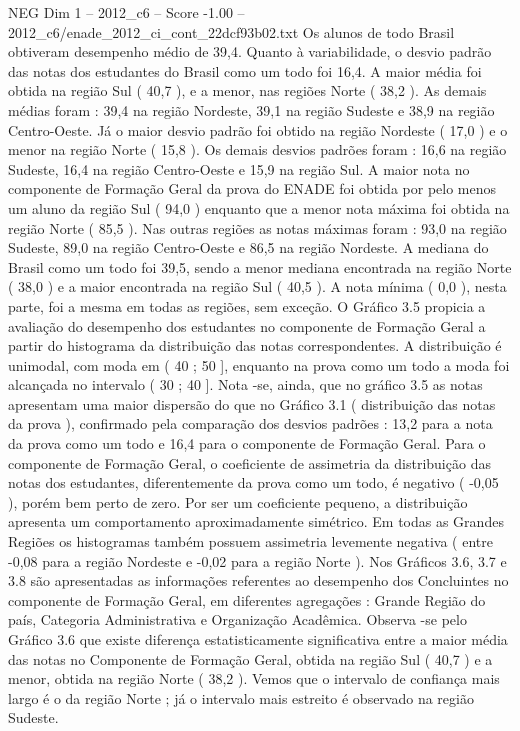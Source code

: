\begin{textsample}{NEG Dim 1 – 2012\_c6 – Score -1.00 – 2012\_c6/enade\_2012\_ci\_cont\_22dcf93b02.txt}
Os alunos de todo Brasil obtiveram desempenho médio de 39,4.
Quanto à variabilidade, o desvio padrão das notas dos estudantes do Brasil como um todo foi 16,4.
A maior média foi obtida na região Sul ( 40,7 ), e a menor, nas regiões Norte ( 38,2 ).
As demais médias foram : 39,4 na região Nordeste, 39,1 na região Sudeste e 38,9 na região Centro-Oeste.
Já o maior desvio padrão foi obtido na região Nordeste ( 17,0 ) e o menor na região Norte ( 15,8 ).
Os demais desvios padrões foram : 16,6 na região Sudeste, 16,4 na região Centro-Oeste e 15,9 na região Sul.
A maior nota no componente de Formação Geral da prova do ENADE foi obtida por pelo menos um aluno da região Sul ( 94,0 ) enquanto que a menor nota máxima foi obtida na região Norte ( 85,5 ).
Nas outras regiões as notas máximas foram : 93,0 na região Sudeste, 89,0 na região Centro-Oeste e 86,5 na região Nordeste.
A mediana do Brasil como um todo foi 39,5, sendo a menor mediana encontrada na região Norte ( 38,0 ) e a maior encontrada na região Sul ( 40,5 ).
A nota mínima ( 0,0 ), nesta parte, foi a mesma em todas as regiões, sem exceção.
O Gráfico 3.5 propicia a avaliação do desempenho dos estudantes no componente de Formação Geral a partir do histograma da distribuição das notas correspondentes.
A distribuição é unimodal, com moda em ( 40 ; 50 ], enquanto na prova como um todo a moda foi alcançada no intervalo ( 30 ; 40 ].
Nota -se, ainda, que no gráfico 3.5 as notas apresentam uma maior dispersão do que no Gráfico 3.1 ( distribuição das notas da prova ), confirmado pela comparação dos desvios padrões : 13,2 para a nota da prova como um todo e 16,4 para o componente de Formação Geral.
Para o componente de Formação Geral, o coeficiente de assimetria da distribuição das notas dos estudantes, diferentemente da prova como um todo, é negativo ( -0,05 ), porém bem perto de zero.
Por ser um coeficiente pequeno, a distribuição apresenta um comportamento aproximadamente simétrico.
Em todas as Grandes Regiões os histogramas também possuem assimetria levemente negativa ( entre -0,08 para a região Nordeste e -0,02 para a região Norte ).
Nos Gráficos 3.6, 3.7 e 3.8 são apresentadas as informações referentes ao desempenho dos Concluintes no componente de Formação Geral, em diferentes agregações : Grande Região do país, Categoria Administrativa e Organização Acadêmica.
Observa -se pelo Gráfico 3.6 que existe diferença estatisticamente significativa entre a maior média das notas no Componente de Formação Geral, obtida na região Sul ( 40,7 ) e a menor, obtida na região Norte ( 38,2 ).
Vemos que o intervalo de confiança mais largo é o da região Norte ; já o intervalo mais estreito é observado na região Sudeste.

\end{textsample}
